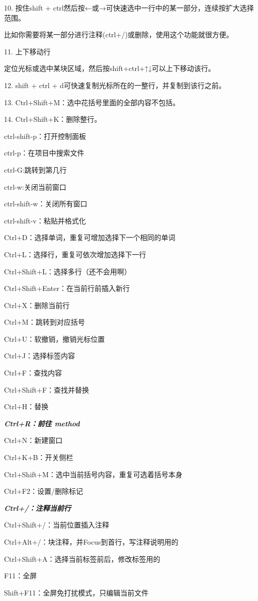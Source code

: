\documentclass[a4paper,UTF8]{article}
\begin{document}
10. 按住shift + ctrl然后按←或→可快速选中一行中的某一部分，连续按扩大选择范围。

比如你需要将某一部分进行注释(ctrl+/)或删除，使用这个功能就很方便。

11. 上下移动行

定位光标或选中某块区域，然后按shift+ctrl+↑↓可以上下移动该行。

12. shift + ctrl + d可快速复制光标所在的一整行，并复制到该行之前。

13. Ctrl+Shift+M：选中花括号里面的全部内容不包括{}。

14. Ctrl+Shift+K：删除整行。

ctrl-shift-p：打开控制面板

ctrl-p：在项目中搜索文件

ctrl-G:跳转到第几行


ctrl-w:关闭当前窗口

ctrl-shift-w：关闭所有窗口

ctrl-shift-v：粘贴并格式化

Ctrl+D：选择单词，重复可增加选择下一个相同的单词

Ctrl+L：选择行，重复可依次增加选择下一行

Ctrl+Shift+L：选择多行（还不会用啊）

Ctrl+Shift+Enter：在当前行前插入新行

Ctrl+X：删除当前行

Ctrl+M：跳转到对应括号

Ctrl+U：软撤销，撤销光标位置

Ctrl+J：选择标签内容

Ctrl+F：查找内容

Ctrl+Shift+F：查找并替换

Ctrl+H：替换

\textbf{\emph{Ctrl+R：前往 method}}

Ctrl+N：新建窗口

Ctrl+K+B：开关侧栏

Ctrl+Shift+M：选中当前括号内容，重复可选着括号本身

Ctrl+F2：设置/删除标记

\textbf{\emph{Ctrl+/：注释当前行}}

Ctrl+Shift+/：当前位置插入注释

Ctrl+Alt+/：块注释，并Focus到首行，写注释说明用的

Ctrl+Shift+A：选择当前标签前后，修改标签用的

F11：全屏

Shift+F11：全屏免打扰模式，只编辑当前文件
\end{document}
